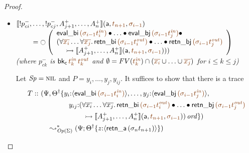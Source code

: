 \begin{proof}
\begin{itemize}
\item $\opbasic{{!}p^-_{ci},\ldots,{!}p^-_{cj},A^+_{j+1},\ldots,A^+_n}{t_{n+1}}{\sigma_{i-1}}$
  \\
  $~ \qquad = {\ocircle}\left(
      \begin{array}{l}
        {\sf eval\_bi}\,\lf{({\sigma_{i-1}}t^{\it in}_i)}
                    \fuse  \ldots \fuse
                 {\sf eval\_bj}\,\lf{({\sigma_{i-1}}t^{\it in}_j)} \fuse ~
      \\
      (\forall\lf{\overline{x_i}}\ldots\forall\lf{\overline{x_j}}.\, 
        {\sf retn\_bi}\,\lf{(\sigma_{i-1}{t^{\it out}_i})}
        \fuse \ldots \fuse 
        {\sf retn\_bj}\,\lf{(\sigma_{i-1}{t^{\it out}_j})}
      \\
      ~ \quad
      \lefti \opbasic{A^+_{j+1},\ldots,A^+_n}{t_{n+1}}{\sigma_{i-1}}))
      \end{array}\right)$\\
  {\it (where
   $p^-_{ck}$ is ${\sf bk_c}\,\lf{t^{\it in}_k}\,\lf{t^{\it out}_k}$ 
   and $\emptyset = FV(\lf{t_k^{\it in}}) \cap (\lf{\overline{x_i}} \cup \ldots \cup \lf{\overline{x_j}})$ 
   for $i \leq k \leq j$)}

  \bigskip
  Let ${\it Sp} = \textsc{nil}$ and $P = y_i,\ldots,y_j,y_{ij}$. It suffices 
  to show that there is a trace
\begin{align*}
  T ::  ~  &(\Psi, \opsubst{\Theta} \tackonstart
        y_i{:}\susp{{\sf eval\_bi}\,\lf{({\sigma_{i-1}}t^{\it in}_i)}}, \ldots,
    y_j{:}\susp{{\sf eval\_bj}\,\lf{({\sigma_{i-1}}t^{\it in}_j)}},
  \\
  & \qquad\qquad y_{ij}{:}(\forall\overline{x_i}\ldots\forall\overline{x_j}.\, 
     {\sf retn\_bi}\,\lf{(\sigma_{i-1}{t^{\it out}_i})}
     \fuse \ldots \fuse 
     {\sf retn\_bj}\,\lf{(\sigma_{i-1}{t^{\it out}_j})}\\
  & \qquad\qquad\qquad
      \lefti \opbasic{A^+_{j+1},\ldots,A^+_n}{t_{n+1}}{\sigma_{i-1}})\,\mtrue
       \tackonstop)
  \\
  & \quad \leadsto^*_{\transop{\Sigma}} 
     (\Psi; \tackon{\opsubst{\Theta}}{z{:}\susp{{\sf retn\_a}\,({\sigma_n}t_{n+1})}})
\end{align*}


\end{itemize}
\end{proof}
